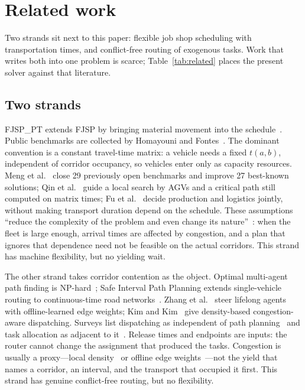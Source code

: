 \documentclass[manuscript,screen,review]{acmart}
\begin{document}
\section{Related work}
\label{sec:Chapter_II}

Two strands sit next to this paper: flexible job shop scheduling with transportation times, and conflict-free routing of exogenous tasks.
Work that writes both into one problem is scarce; Table~\ref{tab:related} places the present solver against that literature.

\subsection{Two strands}

FJSP\_PT extends FJSP by bringing material movement into the schedule~\cite{xin2025review,dauzereperes2024fjsp}.
Public benchmarks are collected by Homayouni and Fontes~\cite{homayouni2021production}.
The dominant convention is a constant travel-time matrix: a vehicle needs a fixed $t(a,b)$, independent of corridor occupancy, so vehicles enter only as capacity resources.
Meng et al.~\cite{meng2025cp} close 29 previously open benchmarks and improve 27 best-known solutions; Qin et al.~\cite{qin2026knowledge} guide a local search by AGVs and a critical path still computed on matrix times; Fu et al.~\cite{fu2025integrated} decide production and logistics jointly, without making transport duration depend on the schedule.
These assumptions ``reduce the complexity of the problem and even change its nature''~\cite{xin2025review}: when the fleet is large enough, arrival times are affected by congestion, and a plan that ignores that dependence need not be feasible on the actual corridors.
This strand has machine flexibility, but no yielding wait.

The other strand takes corridor contention as the object.
Optimal multi-agent path finding is NP-hard~\cite{gao2023mapf}; Safe Interval Path Planning extends single-vehicle routing to continuous-time road networks~\cite{kasaura2022sipp}.
Zhang et al.~\cite{zhang2024guidance} steer lifelong agents with offline-learned edge weights; Kim and Kim~\cite{kim2026congestion} give density-based congestion-aware dispatching.
Surveys list dispatching as independent of path planning~\cite{lu2022agv} and task allocation as adjacent to it~\cite{fragapane2021planning}.
Release times and endpoints are inputs: the router cannot change the assignment that produced the tasks.
Congestion is usually a proxy---local density~\cite{kim2026congestion} or offline edge weights~\cite{zhang2024guidance}---not the yield that names a corridor, an interval, and the transport that occupied it first.
This strand has genuine conflict-free routing, but no flexibility.
\end{document}
